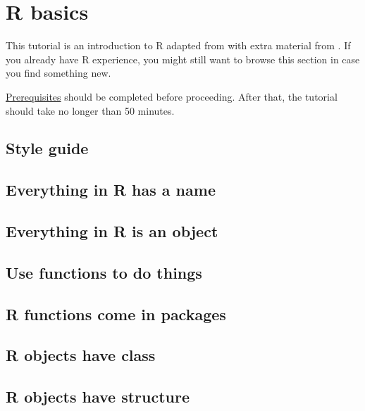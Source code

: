 \documentclass[
]{book}
\begin{document}
\hypertarget{r-basics}{%
\section{R basics}\label{r-basics}}

This tutorial is an introduction to R adapted from \citep{Healy:2019:Ch.2} with extra material from \citep{Matloff:2019}. If you already have R experience, you might still want to browse this section in case you find something new.

\protect\hyperlink{prerequisites}{Prerequisites} should be completed before proceeding. After that, the tutorial should take no longer than 50 minutes.

\hypertarget{style-guide}{%
\subsection{Style guide}\label{style-guide}}

\hypertarget{everything-in-r-has-a-name}{%
\subsection{Everything in R has a name}\label{everything-in-r-has-a-name}}

\hypertarget{everything-in-r-is-an-object}{%
\subsection{Everything in R is an object}\label{everything-in-r-is-an-object}}

\hypertarget{use-functions-to-do-things}{%
\subsection{Use functions to do things}\label{use-functions-to-do-things}}

\hypertarget{r-functions-come-in-packages}{%
\subsection{R functions come in packages}\label{r-functions-come-in-packages}}

\hypertarget{r-objects-have-class}{%
\subsection{R objects have class}\label{r-objects-have-class}}

\hypertarget{r-objects-have-structure}{%
\subsection{R objects have structure}\label{r-objects-have-structure}}
\end{document}
